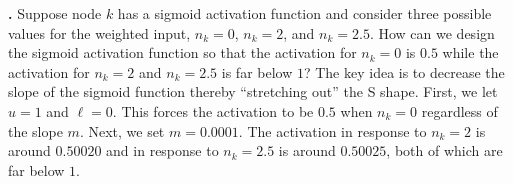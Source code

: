 \noindent
{\bf \theActFunctionCounter.} Suppose node $k$ has a sigmoid activation function and 
consider three possible values for the weighted input, \ie $n_k=0$, $n_k = 2$, and 
$n_k=2.5$. How can we design the sigmoid activation function so that the 
activation for $n_k=0$ is $0.5$ while the activation for $n_k = 2$ and 
$n_k=2.5$ is far below $1$?  The key idea is to decrease the slope of the 
sigmoid function thereby ``stretching out'' the S shape. First, we let $u=1$ 
and $\ell=0$. This forces the activation to be $0.5$ when $n_k=0$ regardless 
of the slope $m$. Next, we set $m=0.0001$. The activation in response to 
$n_k=2$ is around $0.50020$ and in response to $n_k=2.5$ is around $0.50025$, 
both of which are far below $1$.

\bigskip
